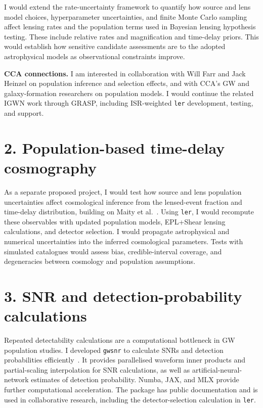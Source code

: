 \documentclass[11pt]{article}
\begin{document}
I would extend the rate-uncertainty framework to quantify how source and lens model choices, hyperparameter uncertainties, and finite Monte Carlo sampling affect lensing rates and the population terms used in Bayesian lensing hypothesis testing. These include relative rates and magnification and time-delay priors. This would establish how sensitive candidate assessments are to the adopted astrophysical models as observational constraints improve.

\textbf{CCA connections.} I am interested in collaboration with Will Farr and Jack Heinzel on population inference and selection effects, and with CCA's GW and galaxy-formation researchers on population models. I would continue the related IGWN work through GRASP, including ISR-weighted \texttt{ler} development, testing, and support.

\section*{2. Population-based time-delay cosmography}

As a separate proposed project, I would test how source and lens population uncertainties affect cosmological inference from the lensed-event fraction and time-delay distribution, building on Maity et al.~\cite{cosmography}. Using \texttt{ler}, I would recompute these observables with updated population models, EPL+Shear lensing calculations, and detector selection. I would propagate astrophysical and numerical uncertainties into the inferred cosmological parameters. Tests with simulated catalogues would assess bias, credible-interval coverage, and degeneracies between cosmology and population assumptions.

\newpage
\section*{3. SNR and detection-probability calculations}

Repeated detectability calculations are a computational bottleneck in GW population studies. I developed \texttt{gwsnr} to calculate SNRs and detection probabilities efficiently~\cite{gwsnr}. It provides parallelised waveform inner products and partial-scaling interpolation for SNR calculations, as well as artificial-neural-network estimates of detection probability. Numba, JAX, and MLX provide further computational acceleration. The package has public documentation and is used in collaborative research, including the detector-selection calculation in \texttt{ler}.
\end{document}
